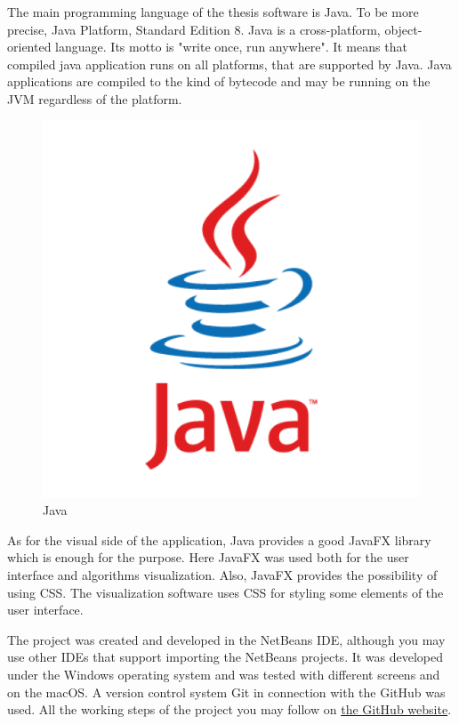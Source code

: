 \documentclass[
  field=inf,
  biblatex,
  language=english,
  glossaries,
  theorems=false,
  sourcecodes=false,
  index
]{kidiplom}
\begin{document}
The main programming language of the thesis software is Java. To be more precise, Java Platform, Standard Edition 8. Java is a cross-platform, object-oriented language. Its motto is "write once, run anywhere". It means that compiled java application runs on all platforms, that are supported by Java. Java applications are compiled to the kind of bytecode and may be running on the \Gls{JVM} regardless of the platform. 

\begin{figure}[H]
\begin{center}
	
	\includegraphics[scale=0.2]{img/java_logo.png}
	\caption{Java}\label{fig:java}
\end{center}
\end{figure}

As for the visual side of the application, Java provides a good JavaFX library which is enough for the purpose. Here JavaFX was used both for the user interface and algorithms visualization. Also, JavaFX provides the possibility of using \Gls{CSS}. The visualization software uses \Gls{CSS} for styling some elements of the user interface.

The project was created and developed in the NetBeans IDE, although you may use other IDEs that support importing the NetBeans projects. It was developed under the Windows operating system and was tested with different screens and on the macOS. A version control system Git in connection with the GitHub was used. All the working steps of the project you may follow on \href{https://github.com/klnmi97/Sorting-Visualization}{the GitHub website}.
\end{document}
